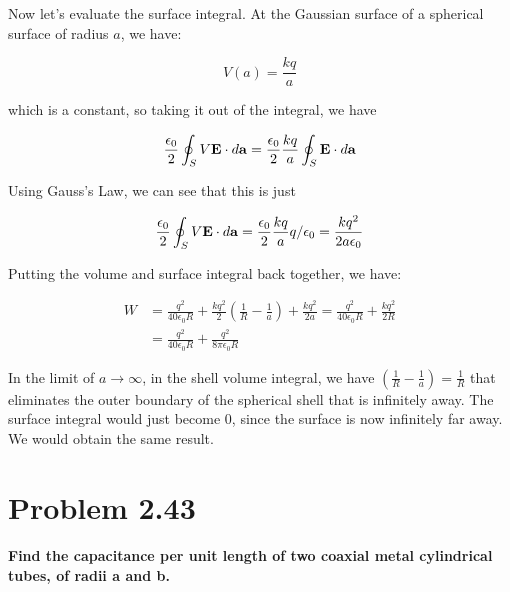 \documentclass{article}
\numberwithin{equation}{section}
\numberwithin{figure}{section}
\begin{document}
Now let's evaluate the surface integral. At the Gaussian surface of a spherical surface of radius $a$, we have:

\begin{equation}
    V(a) = \frac{kq}{a}
\end{equation}

which is a constant, so taking it out of the integral, we have

\begin{equation}
    \frac{\epsilon_0}{2} \oint_S V \vb E \cdot d \vb a =  \frac{\epsilon_0}{2} \frac{kq}{a} \oint_S \vb E \cdot d \vb a
\end{equation}

Using Gauss's Law, we can see that this is just

\begin{equation}
    \frac{\epsilon_0}{2} \oint_S V \vb E \cdot d \vb a =  \frac{\epsilon_0}{2} \frac{kq}{a} q / \epsilon_0 = \frac{kq^2}{2a\epsilon_0}
\end{equation}

Putting the volume and surface integral back together, we have:

\begin{equation}
\begin{split}
        W &= \frac{q^2}{40 \epsilon_0 R} + \frac{kq^2}{2} (\frac{1}{R} - \frac{1}{a}) + \frac{kq^2}{2a} = \frac{q^2}{40 \epsilon_0 R} + \frac{kq^2}{2R} \\
        &= \frac{q^2}{40 \epsilon_0 R} + \frac{q^2}{8 \pi \epsilon_0 R }
\end{split}
\end{equation}

In the limit of $a \to \infty$, in the shell volume integral, we have $(\frac{1}{R} - \frac{1}{a}) = \frac{1}{R}$ that eliminates the outer boundary of the spherical shell that is infinitely away. The surface integral would just become 0, since the surface is now infinitely far away. We would obtain the same result.

\section{Problem 2.43}

\paragraph{Find the capacitance per unit length of two coaxial metal cylindrical tubes, of radii a and b. \\}
\end{document}
